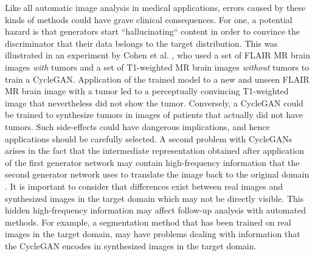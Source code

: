 \documentclass{article}
\begin{document}
Like all automatic image analysis in medical applications, errors caused by these kinds of methods could have grave clinical consequences. For one, a potential hazard is that generators start ``hallucinating`` content in order to convince the discriminator that their data belongs to the target distribution. This was illustrated in an experiment by Cohen et al. \cite{Cohe18}, who used a set of FLAIR MR brain images \textit{with} tumors and a set of T1-weighted MR brain images \textit{without} tumors to train a CycleGAN. Application of the trained model to a new and unseen FLAIR MR brain image with a tumor led to a perceptually convincing T1-weighted image that nevertheless did not show the tumor. Conversely, a CycleGAN could be trained to synthesize tumors in images of patients that actually did not have tumors. Such side-effects could have dangerous implications, and hence applications should be carefully selected. 
A second problem with CycleGANs arises in the fact that the intermediate representation obtained after application of the first generator network may contain high-frequency information that the second generator network uses to translate the image back to the original domain \cite{Chu17}. It is important to consider that differences exist between real images and synthesized images in the target domain which may not be directly visible. This hidden high-frequency information may affect follow-up analysis with automated methods. For example, a segmentation method that has been trained on real images in the target domain, may have problems dealing with information that the CycleGAN encodes in synthesized images in the target domain.
\end{document}

